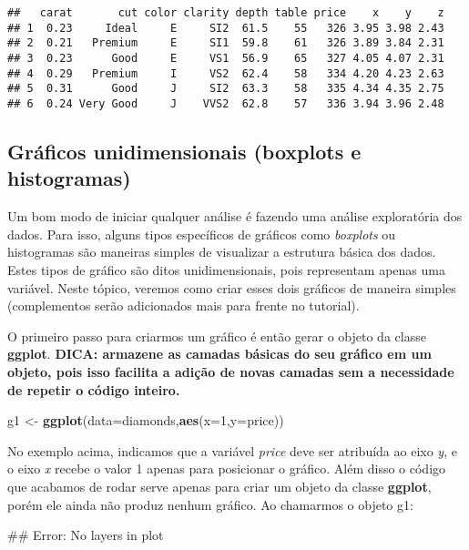\documentclass[]{article}
\newenvironment{Shaded}{\begin{snugshade}}{\end{snugshade}}
\newcommand{\KeywordTok}[1]{\textcolor[rgb]{0.13,0.29,0.53}{\textbf{{#1}}}}
\newcommand{\DataTypeTok}[1]{\textcolor[rgb]{0.13,0.29,0.53}{{#1}}}
\newcommand{\DecValTok}[1]{\textcolor[rgb]{0.00,0.00,0.81}{{#1}}}
\newcommand{\StringTok}[1]{\textcolor[rgb]{0.31,0.60,0.02}{{#1}}}
\newcommand{\NormalTok}[1]{{#1}}
\begin{document}
\begin{verbatim}
##   carat       cut color clarity depth table price    x    y    z
## 1  0.23     Ideal     E     SI2  61.5    55   326 3.95 3.98 2.43
## 2  0.21   Premium     E     SI1  59.8    61   326 3.89 3.84 2.31
## 3  0.23      Good     E     VS1  56.9    65   327 4.05 4.07 2.31
## 4  0.29   Premium     I     VS2  62.4    58   334 4.20 4.23 2.63
## 5  0.31      Good     J     SI2  63.3    58   335 4.34 4.35 2.75
## 6  0.24 Very Good     J    VVS2  62.8    57   336 3.94 3.96 2.48
\end{verbatim}

\subsection{Gráficos unidimensionais (boxplots e
histogramas)}\label{graficos-unidimensionais-boxplots-e-histogramas}

Um bom modo de iniciar qualquer análise é fazendo uma análise
exploratória dos dados. Para isso, alguns tipos específicos de gráficos
como \emph{boxplots} ou histogramas são maneiras simples de visualizar a
estrutura básica dos dados. Estes tipos de gráfico são ditos
unidimensionais, pois representam apenas uma variável. Neste tópico,
veremos como criar esses dois gráficos de maneira simples (complementos
serão adicionados mais para frente no tutorial).

O primeiro passo para criarmos um gráfico é então gerar o objeto da
classe \textbf{ggplot}. \textbf{DICA: armazene as camadas básicas do seu
gráfico em um objeto, pois isso facilita a adição de novas camadas sem a
necessidade de repetir o código inteiro.}

\begin{Shaded}
\begin{Highlighting}[]
\NormalTok{g1 <-}\StringTok{ }\KeywordTok{ggplot}\NormalTok{(}\DataTypeTok{data=}\NormalTok{diamonds,}\KeywordTok{aes}\NormalTok{(}\DataTypeTok{x=}\DecValTok{1}\NormalTok{,}\DataTypeTok{y=}\NormalTok{price))}
\end{Highlighting}
\end{Shaded}

No exemplo acima, indicamos que a variável \emph{price} deve ser
atribuída ao eixo \emph{y}, e o eixo \emph{x} recebe o valor 1 apenas
para posicionar o gráfico. Além disso o código que acabamos de rodar
serve apenas para criar um objeto da classe \textbf{ggplot}, porém ele
ainda não produz nenhum gráfico. Ao chamarmos o objeto g1:

\begin{Shaded}
\begin{Highlighting}[]
\NormalTok{## Error: No layers in plot}
\end{Highlighting}
\end{Shaded}
\end{document}
